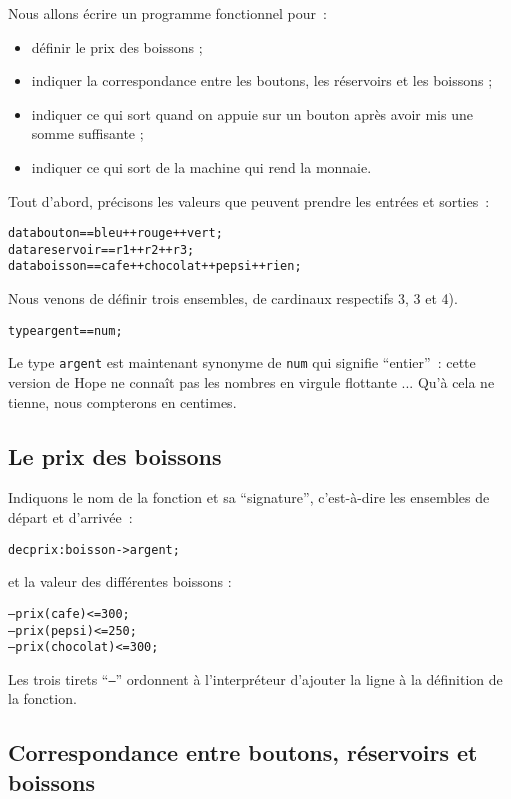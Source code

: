 Nous allons écrire un programme fonctionnel pour~:
\begin{itemize}
 \item définir le prix des boissons ;
\item  indiquer la correspondance entre les boutons, les réservoirs et les boissons ;
 \item indiquer ce qui sort quand on appuie sur un bouton après avoir mis une somme suffisante ;
 \item indiquer ce qui sort de la machine qui rend la monnaie.
\end{itemize}

Tout d'abord, précisons les valeurs que peuvent prendre les entrées et sorties~:

\begin{alltt}
	data  bouton	== bleu ++ rouge ++ vert ;
	data  reservoir	== r1 ++ r2 ++ r3 ;
	data  boisson	== cafe ++ chocolat ++ pepsi ++ rien ;
\end{alltt}
Nous venons de définir trois ensembles, de cardinaux respectifs 3, 3 et 4).
\begin{alltt}
	type  argent 	== num ;
\end{alltt}

Le type \texttt{argent} est maintenant synonyme de \texttt{num} qui signifie
``entier''~: cette version de
Hope ne connaît pas les nombres en virgule flottante ... Qu'à
cela ne tienne, nous compterons en centimes.


\subsection{Le prix des boissons}

Indiquons le nom de la fonction et sa ``signature'', c'est-à-dire
les ensembles de départ et d'arrivée~:
\begin{alltt}
	dec prix : boisson -> argent;
\end{alltt}
et la valeur des différentes boissons :
\begin{alltt}
--- prix(cafe)		<= 300;
--- prix(pepsi)		<= 250;
--- prix(chocolat)	<= 300;
\end{alltt}
Les trois tirets ``{\tt ---}'' ordonnent à l'interpréteur d'ajouter
 la ligne à la définition de la fonction.


\subsection{Correspondance entre boutons, réservoirs et boissons}

